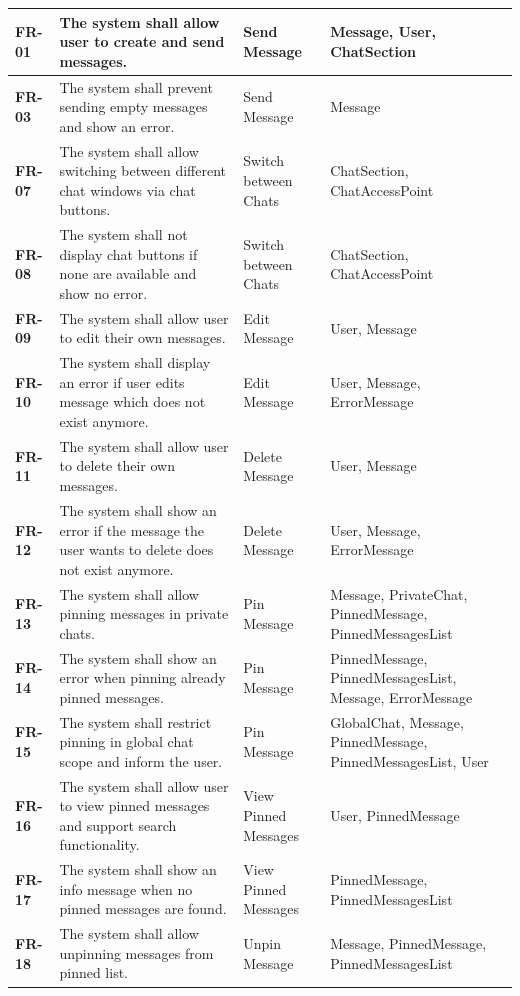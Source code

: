 \begin{longtable}{|p{3cm}|p{5.5cm}|l|p{4cm}|}
\textbf{FR-01} & The system shall allow user to create and send messages. & Send Message & Message, User, ChatSection \\
\hline
\textbf{FR-03} & The system shall prevent sending empty messages and show an error. & Send Message & Message \\
\hline
\textbf{FR-07} & The system shall allow switching between different chat windows via chat buttons. & Switch between Chats & ChatSection, ChatAccessPoint \\
\hline
\textbf{FR-08} & The system shall not display chat buttons if none are available and show no error. & Switch between Chats & ChatSection, ChatAccessPoint \\
\hline
\textbf{FR-09} & The system shall allow user to edit their own messages. & Edit Message & User, Message \\
\hline
\textbf{FR-10} & The system shall display an error if user edits message which does not exist anymore. & Edit Message & User, Message, ErrorMessage \\
\hline
\textbf{FR-11} & The system shall allow user to delete their own messages. & Delete Message & User, Message \\
\hline
\textbf{FR-12} & The system shall show an error if the message the user wants to delete does not exist anymore. & Delete Message & User, Message, ErrorMessage \\
\hline
\textbf{FR-13} & The system shall allow pinning messages in private chats. & Pin Message & Message, PrivateChat, PinnedMessage, PinnedMessagesList \\
\hline
\textbf{FR-14} & The system shall show an error when pinning already pinned messages. & Pin Message & PinnedMessage, PinnedMessagesList, Message, ErrorMessage \\
\hline
\textbf{FR-15} & The system shall restrict pinning in global chat scope and inform the user. & Pin Message & GlobalChat, Message, PinnedMessage, PinnedMessagesList, User \\
\hline
\textbf{FR-16} & The system shall allow user to view pinned messages and support search functionality. & View Pinned Messages & User, PinnedMessage \\
\hline
\textbf{FR-17} & The system shall show an info message when no pinned messages are found. & View Pinned Messages & PinnedMessage, PinnedMessagesList \\
\hline
\textbf{FR-18} & The system shall allow unpinning messages from pinned list. & Unpin Message & Message, PinnedMessage, PinnedMessagesList \\

\end{longtable}
